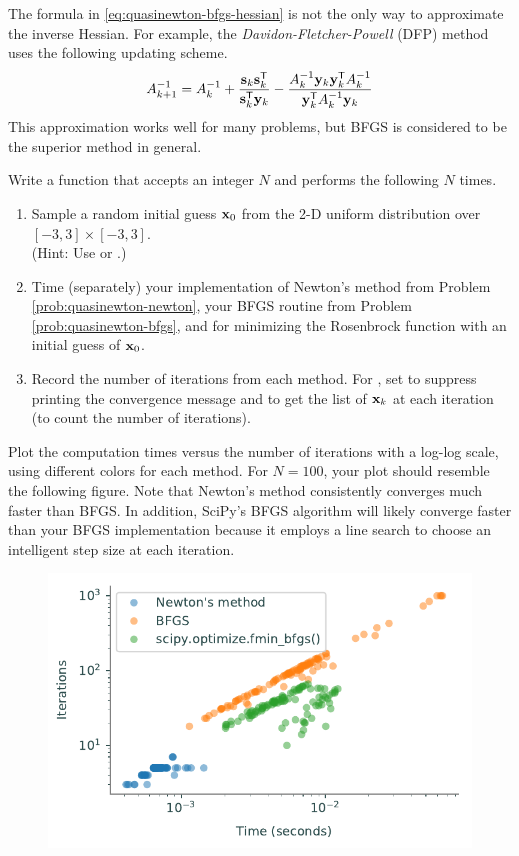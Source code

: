\begin{info}
The formula in \eqref{eq:quasinewton-bfgs-hessian} is not the only way to approximate the inverse Hessian.
For example, the \emph{Davidon-Fletcher-Powell} (DFP) method uses the following updating scheme.
\[
A_{k+1}^{-1} = A_k^{-1} +
\frac{\mathbf{s}_k\mathbf{s}_k^{\mathsf T}}{\mathbf{s}_k^{\mathsf T} \mathbf{y}_k}
- \frac{A_k^{-1}\mathbf{y}_k\mathbf{y}_k^{\mathsf T} A_k^{-1}}{\mathbf{y}_k^{\mathsf T} A_k^{-1}\mathbf{y}_k}
\]
This approximation works well for many problems, but BFGS is considered to be the superior method in general.
\end{info}

\begin{problem} %
Write a function that accepts an integer $N$ and performs the following $N$ times.
\begin{enumerate}
\item Sample a random initial guess $\mathbf{x}_0$ from the 2-D uniform distribution over $[-3,3]\times[-3,3]$.
\\(Hint: Use  or .)
\item Time (separately) your implementation of Newton's method from Problem \ref{prob:quasinewton-newton}, your BFGS routine from Problem \ref{prob:quasinewton-bfgs}, and  for minimizing the Rosenbrock function with an initial guess of $\mathbf{x}_0$.
\item Record the number of iterations from each method.
For , set  to suppress printing the convergence message and  to get the list of $\mathbf{x}_k$ at each iteration (to count the number of iterations).
\end{enumerate}

Plot the computation times versus the number of iterations with a log-log scale, using different colors for each method.
For $N = 100$, your plot should resemble the following figure.
Note that Newton's method consistently converges much faster than BFGS.
In addition, SciPy's BFGS algorithm will likely converge faster than your BFGS implementation because it employs a line search to choose an intelligent step size at each iteration.
\begin{figure}[H]
    \includegraphics[width=.7\textwidth]{figures/newton_comparison.pdf}
\end{figure}
\end{problem}

